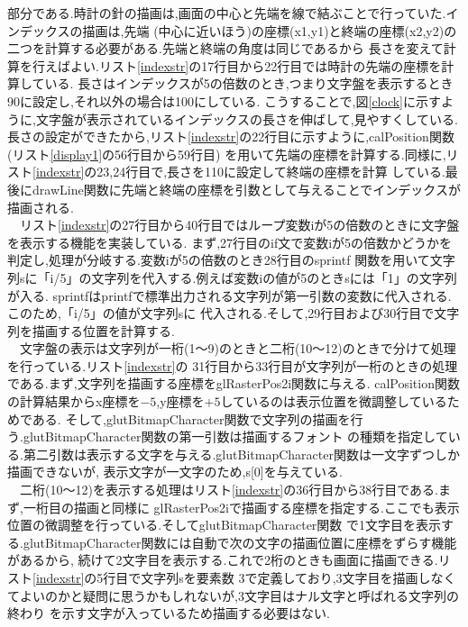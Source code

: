 \documentclass[a4j]{jarticle}
\begin{document}
    部分である.時計の針の描画は,画面の中心と先端を線で結ぶことで行っていた.インデックスの描画は,先端
    (中心に近いほう)の座標(x1,y1)と終端の座標(x2,y2)の二つを計算する必要がある.先端と終端の角度は同じであるから
    長さを変えて計算を行えばよい.リスト\ref{indexstr}の17行目から22行目では時計の先端の座標を計算している.
    長さはインデックスが5の倍数のとき,つまり文字盤を表示するとき90に設定し,それ以外の場合は100にしている.
    こうすることで,図\ref{clock}に示すように,文字盤が表示されているインデックスの長さを伸ばして,見やすくしている.
    長さの設定ができたから,リスト\ref{indexstr}の22行目に示すように,calPosition関数(リスト\ref{display1}の56行目から59行目)
    を用いて先端の座標を計算する.同様に,リスト\ref{indexstr}の23,24行目で,長さを110に設定して終端の座標を計算
    している.最後にdrawLine関数に先端と終端の座標を引数として与えることでインデックスが描画される.\\
    　リスト\ref{indexstr}の27行目から40行目ではループ変数iが5の倍数のときに文字盤を表示する機能を実装している.
    まず,27行目のif文で変数iが5の倍数かどうかを判定し,処理が分岐する.変数iが5の倍数のとき28行目のsprintf
    関数を用いて文字列sに「i/5」の文字列を代入する.例えば変数iの値が5のときsには「1」の文字列が入る.
    sprintfはprintfで標準出力される文字列が第一引数の変数に代入される.このため,「i/5」の値が文字列sに
    代入される.そして,29行目および30行目で文字列を描画する位置を計算する.\\
    　文字盤の表示は文字列が一桁(1～9)のときと二桁(10～12)のときで分けて処理を行っている.リスト\ref{indexstr}の
    31行目から33行目が文字列が一桁のときの処理である.まず,文字列を描画する座標をglRasterPos2i関数に与える.
    calPosition関数の計算結果からx座標を$-5$,y座標を$+5$しているのは表示位置を微調整しているためである.
    そして,glutBitmapCharacter関数で文字列の描画を行う.glutBitmapCharacter関数の第一引数は描画するフォント
    の種類を指定している.第二引数は表示する文字を与える.glutBitmapCharacter関数は一文字ずつしか描画できないが,
    表示文字が一文字のため,s[0]を与えている.\\
    　二桁(10～12)を表示する処理はリスト\ref{indexstr}の36行目から38行目である.まず,一桁目の描画と同様に
    glRasterPos2iで描画する座標を指定する.ここでも表示位置の微調整を行っている.そしてglutBitmapCharacter関数
    で1文字目を表示する.glutBitmapCharacter関数には自動で次の文字の描画位置に座標をずらす機能があるから,
    続けて2文字目を表示する.これで2桁のときも画面に描画できる.リスト\ref{indexstr}の5行目で文字列sを要素数
    3で定義しており,3文字目を描画しなくてよいのかと疑問に思うかもしれないが,3文字目はナル文字と呼ばれる文字列の終わり
    を示す文字が入っているため描画する必要はない.
\end{document}
